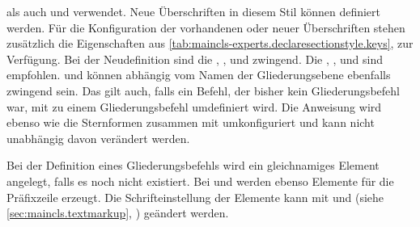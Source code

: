\begin{description}
   als auch
   und
   verwendet. Neue
  Überschriften in diesem Stil können definiert werden. Für die Konfiguration
  der vorhandenen oder neuer Überschriften stehen zusätzlich die Eigenschaften
  aus \autoref{tab:maincls-experts.declaresectionstyle.keys},
   zur
  Verfügung. Bei der Neudefinition sind die 
  , ,  und 
  zwingend.  Die 
  , ,  und
   sind empfohlen.   und 
  können abhängig vom Namen der Gliederungsebene ebenfalls zwingend sein. Das
  gilt auch, falls ein Befehl, der bisher kein Gliederungsbefehl war, mit
   zu einem Gliederungsbefehl umdefiniert
  wird. Die  Anweisung  wird ebenso wie die
  Sternformen zusammen mit  umkonfiguriert und
  kann nicht unabhängig davon verändert werden.
\end{description}

\BeginIndexGroup%
%
%
Bei der Definition eines Gliederungsbefehls wird ein gleichnamiges
Element%
angelegt, falls es noch nicht existiert. Bei  und
 werden ebenso Elemente für die Präfixzeile erzeugt. Die
Schrifteinstellung der Elemente kann mit  und
 (siehe \autoref{sec:maincls.textmarkup},
) geändert werden.%
\EndIndexGroup

